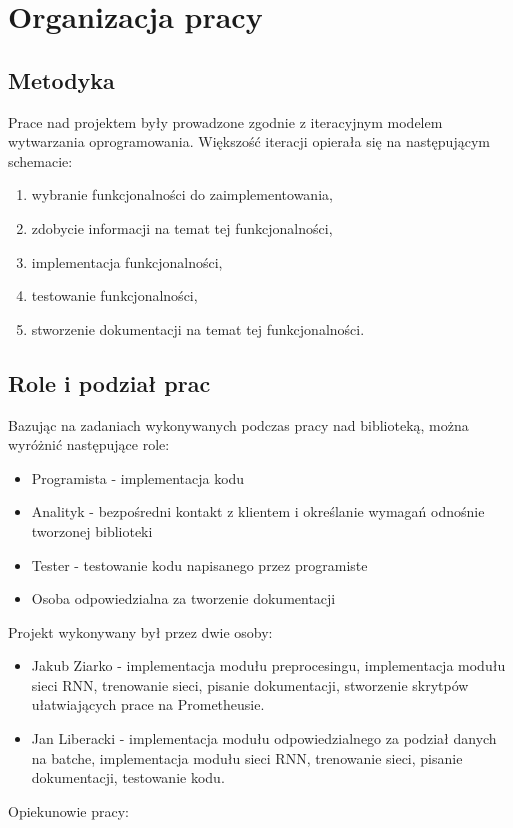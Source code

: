 \newpage
\section{Organizacja pracy}

\subsection{Metodyka}

Prace nad projektem były prowadzone zgodnie z iteracyjnym modelem wytwarzania oprogramowania. 
Większość iteracji opierała się na następującym schemacie: 
\begin{enumerate}
  \item wybranie funkcjonalności do zaimplementowania,
  \item zdobycie informacji na temat tej funkcjonalności,
  \item implementacja funkcjonalności,
  \item testowanie funkcjonalności,
  \item stworzenie dokumentacji na temat tej funkcjonalności.
\end{enumerate}

\subsection{Role i podział prac}
Bazując na zadaniach wykonywanych podczas pracy nad biblioteką, można wyróżnić następujące role:
\begin{itemize}
  \item Programista - implementacja kodu
  \item Analityk -  bezpośredni kontakt z klientem i określanie wymagań odnośnie tworzonej biblioteki
  \item Tester - testowanie kodu napisanego przez programiste
  \item Osoba odpowiedzialna za tworzenie dokumentacji
\end{itemize}
Projekt wykonywany był przez dwie osoby:
\begin{itemize}
  \item Jakub Ziarko - implementacja modułu preprocesingu, implementacja modułu sieci RNN, 
  trenowanie sieci, pisanie dokumentacji, stworzenie skrytpów ułatwiających prace na Prometheusie.
  \item Jan Liberacki - implementacja modułu odpowiedzialnego za podział danych na batche, 
  implementacja modułu sieci RNN, trenowanie sieci, pisanie dokumentacji, testowanie kodu.
\end{itemize}
Opiekunowie pracy:

